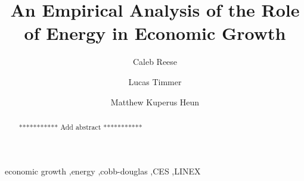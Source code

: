 \documentclass[preprint,authoryear,12pt]{elsarticle}\usepackage{graphicx, color}
\begin{document}
\begin{frontmatter}



\title{An Empirical Analysis of the Role of Energy in Economic Growth}


\author[Calvin]{Caleb Reese}
\author[Calvin]{Lucas Timmer}
\author[Calvin]{Matthew Kuperus Heun}

\address[Calvin]{Engineering Department, Calvin College, Grand Rapids, MI 49546, USA}

\begin{abstract}
*********** Add abstract ***********
\end{abstract}

\begin{keyword}
economic growth \sep energy \sep cobb-douglas \sep CES \sep LINEX
\end{keyword}

\end{frontmatter}

\end{document}
